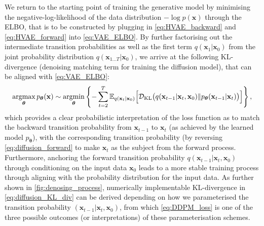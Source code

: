 We return to the starting point of training the generative model by minimising the negative-log-likelihood of the data distribution $-\log p(\bm{x})$ through the ELBO, that is to be constructed by plugging in \cref{eq:HVAE_backward} and \cref{eq:HVAE_forward} into \cref{eq:VAE_ELBO}. By further factorising out the intermediate transition probabilities as well as the first term $q(\bm{x}_1|\bm{x}_0)$ from the joint probability distribution $q(\bm{x}_{1\ldots T}|\bm{x}_0)$, we arrive at the following KL-divergence (denoising matching term for training the diffusion model), that can be aligned with \cref{eq:VAE_ELBO}:
\begin{equation}
    \label{eq:diffusion_KL_div}
\operatorname*{argmax}_{\boldsymbol{\theta}}p_{\boldsymbol{\theta}}(\mathbf{x})\sim\operatorname*{argmin}_{\boldsymbol{\theta}}\left\{ -\sum_{t=2}^T \mathbb{E}_{q(\mathbf{x}_t|\mathbf{x}_0)} \Big[\mathcal{D}_{\mathrm{KL}}\big( q(\mathbf{x}_{t-1}|\mathbf{x}_t,\mathbf{x}_0)\Vert p_{\boldsymbol{\theta}}(\mathbf{x}_{t-1}|\mathbf{x}_t) \big) \Big] \right\},
\end{equation}
which provides a clear probabilistic interpretation of the loss function as to match the backward transition probability from $\bm{x}_{t-1}$ to $\bm{x}_t$ (as achieved by the learned model $p_{\boldsymbol{\theta}}$), with the corresponding transition probability (by reversing \cref{eq:diffusion_forward} to make $\bm{x}_t$ as the subject from the forward process. Furthermore, anchoring the forward transition probability $q(\bm{x}_{t-1}|\bm{x}_t,\bm{x}_0)$ through conditioning on the input data $\bm{x}_0$ leads to a more stable training process through aligning with the probability distribution for the input data. As further shown in \cref{fig:denosing_process}, numerically implementable KL-divergence in \cref{eq:diffusion_KL_div} can be derived depending on how we parameterised the transition probability $(\bm{x}_{t-1}|\bm{x}_t,\bm{x}_0)$, from which \cref{eq:DDPM_loss} is one of the three possible outcomes (or interpretations) of these parameterisation schemes. 

